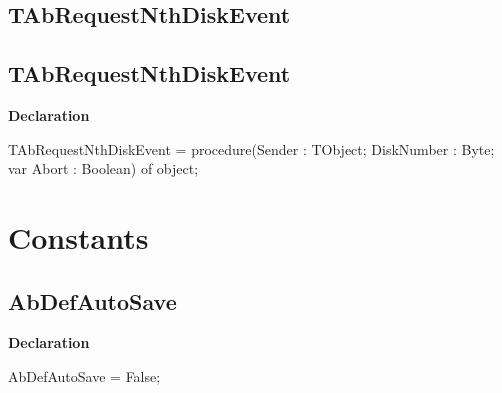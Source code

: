 \documentclass{report}
\newif\ifpdf
\begin{document}
\subsection*{\large{\textbf{TAbRequestNthDiskEvent}}\normalsize\hspace{1ex}\hrulefill}
\else
\subsection*{TAbRequestNthDiskEvent}
\fi
\label{AbArcTyp-TAbRequestNthDiskEvent}
\begin{list}{}{
\setlength{\itemindent}{0cm}
\setlength{\listparindent}{0cm}
\setlength{\leftmargin}{\evensidemargin}
\addtolength{\leftmargin}{\tmplength}
\settowidth{\labelsep}{X}
\addtolength{\leftmargin}{\labelsep}
\setlength{\labelwidth}{\tmplength}
}
\item[\textbf{Declaration}\hfill]
\ifpdf
\begin{flushleft}
\fi
\begin{ttfamily}
TAbRequestNthDiskEvent = procedure(Sender : TObject; DiskNumber : Byte; var Abort : Boolean) of object;\end{ttfamily}

\ifpdf
\end{flushleft}
\fi

\end{list}
\section{Constants}
\ifpdf
\subsection*{\large{\textbf{AbDefAutoSave}}\normalsize\hspace{1ex}\hrulefill}
\else
\subsection*{AbDefAutoSave}
\fi
\label{AbArcTyp-AbDefAutoSave}
\begin{list}{}{
\setlength{\itemindent}{0cm}
\setlength{\listparindent}{0cm}
\setlength{\leftmargin}{\evensidemargin}
\addtolength{\leftmargin}{\tmplength}
\settowidth{\labelsep}{X}
\addtolength{\leftmargin}{\labelsep}
\setlength{\labelwidth}{\tmplength}
}
\item[\textbf{Declaration}\hfill]
\ifpdf
\begin{flushleft}
\fi
\begin{ttfamily}
AbDefAutoSave = False;\end{ttfamily}

\ifpdf
\end{flushleft}
\fi

\end{list}
\ifpdf
\end{document}
